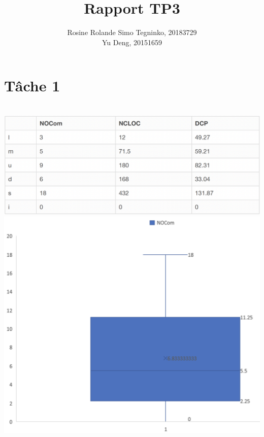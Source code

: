 \documentclass{article}
\title{Rapport TP3}
\author{Rosine Rolande Simo Tegninko, 20183729\\
Yu Deng, 20151659}
\date{}
\begin{document}
\maketitle

\section*{Tâche 1}\\
\includegraphics[scale=0.4]{T1_1.png}\\
\includegraphics[scale=0.5]{NOCom.png}\\
\end{document}
